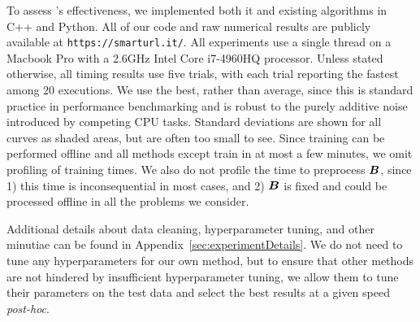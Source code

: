 
To assess \ours's effectiveness, we implemented both it and existing algorithms in C++ and Python. All of our code and raw numerical results are publicly available at \texttt{https://smarturl.it/\ours}. All experiments use a single thread on a Macbook Pro with a 2.6GHz Intel Core i7-4960HQ processor. Unless stated otherwise, all timing results use five trials, with each trial reporting the fastest among 20 executions. We use the best, rather than average, since this is standard practice in performance benchmarking and is robust to the purely additive noise introduced by competing CPU tasks. Standard deviations are shown for all curves as shaded areas, but are often too small to see. Since training can be performed offline and all methods except \cite{sparsePCA} train in at most a few minutes, we omit profiling of training times. We also do not profile the time to preprocess $\bm{B}$, since 1) this time is inconsequential in most cases, and 2) $\bm{B}$ is fixed and could be processed offline in all the problems we consider.



Additional details about data cleaning, hyperparameter tuning, and other minutiae can be found in Appendix~\ref{sec:experimentDetails}. We do not need to tune any hyperparameters for our own method, but to ensure that other methods are not hindered by insufficient hyperparameter tuning, we allow them to tune their parameters on the test data and select the best results at a given speed \textit{post-hoc}.



